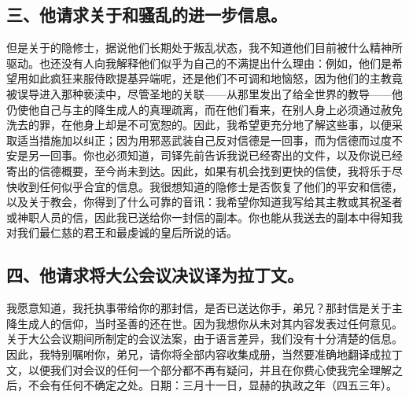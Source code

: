 
\subsection{三、他请求关于和骚乱的进一步信息。}

但是关于的隐修士，据说他们长期处于叛乱状态，我不知道他们目前被什么精神所驱动。也还没有人向我解释他们似乎为自己的不满提出什么理由：例如，他们是希望用如此疯狂来服侍欧提基异端呢，还是他们不可调和地恼怒，因为他们的主教竟被误导进入那种亵渎中，尽管圣地的关联——从那里发出了给全世界的教导——他仍使他自己与主的降生成人的真理疏离，而在他们看来，在别人身上必须通过赦免洗去的罪，在他身上却是不可宽恕的。因此，我希望更充分地了解这些事，以便采取适当措施加以纠正；因为用邪恶武装自己反对信德是一回事，而为信德而过度不安是另一回事。你也必须知道，司铎先前告诉我说已经寄出的文件，以及你说已经寄出的信德概要，至今尚未到达。因此，如果有机会找到更快的信使，我将乐于尽快收到任何似乎合宜的信息。我很想知道的隐修士是否恢复了他们的平安和信德，以及关于教会，你得到了什么可靠的音讯：我希望你知道我写给其主教或其祝圣者或神职人员的信，因此我已送给你一封信的副本。你也能从我送去的副本中得知我对我们最仁慈的君王和最虔诚的皇后所说的话。\par


\subsection{四、他请求将大公会议决议译为拉丁文。}

我愿意知道，我托执事带给你的那封信，是否已送达你手，弟兄？那封信是关于主降生成人的信仰，当时圣善的还在世。因为我想你从未对其内容发表过任何意见。关于大公会议期间所制定的会议法案，由于语言差异，我们没有十分清楚的信息。因此，我特别嘱咐你，弟兄，请你将全部内容收集成册，当然要准确地翻译成拉丁文，以便我们对会议的任何一个部分都不再有疑问，并且在你费心使我完全理解之后，不会有任何不确定之处。日期：三月十一日，显赫的执政之年（四五三年）。\par


